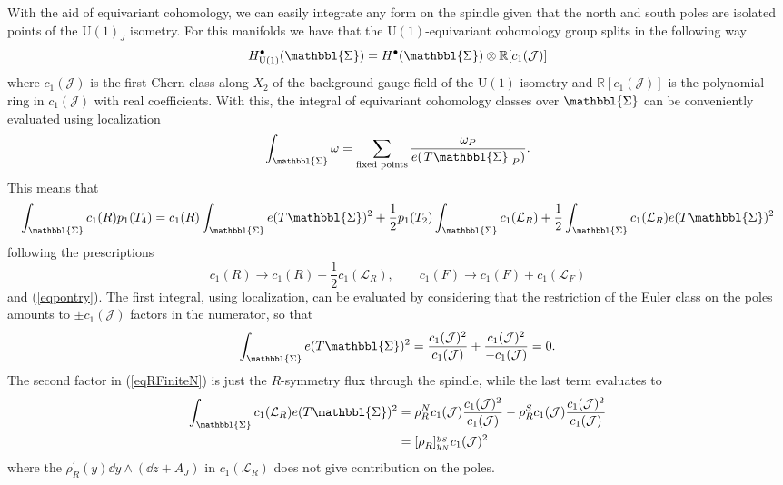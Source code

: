\documentclass[11pt]{article}
\theoremstyle{definition}
\numberwithin{equation}{section}
\newcommand{\flux}[2][]{[\rho_{#2}^{#1}]^{y_S}_{y_N}}
\newcommand{\Spindle}{\mathbbl{\Sigma}}
\newcommand*\U{\mathrm{U}}
\begin{document}
With the aid of equivariant cohomology, we can easily integrate any form on the spindle given that the north and south poles are isolated points of the $\U(1)_{J}$ isometry. For this manifolds we have that the $\U(1)$-equivariant cohomology group splits in the following way
\begin{equation}
	H^{\bullet}_{\U(1)}(\Spindle)=H^{\bullet}(\Spindle)\otimes \mathbb{R}[c_{1}(\mathcal{J})]
\end{equation}
where $c_{1}(\mathcal{J})$ is the first Chern class along $X_{2}$ of the background gauge field of the $\U(1)$ isometry and $\mathbb{R}[c_{1}(\mathcal{J})]$ is the polynomial ring in $c_{1}(\mathcal{J})$ with real coefficients. With this, the integral of equivariant cohomology classes over $\Spindle$ can be conveniently evaluated using localization
\begin{equation}
	\int_{\Spindle}\omega=\sum_{\text{fixed points}}\frac{\omega_{P}}{e(\left.T\Spindle\right|_{P})}.
\end{equation}
This means that
\begin{equation}
	\int_{\Spindle}c_{1}(R)p_{1}(T_{4})=c_{1}(R)\int_{\Spindle}e(T\Spindle)^{2}+\frac{1}{2}p_{1}(T_{2})\int_{\Spindle}c_{1}(\mathcal{L}_{R})+\frac{1}{2}\int_{\Spindle}c_{1}(\mathcal{L}_{R})e(T\Spindle)^{2}
	\label{eqRFiniteN}
\end{equation}
following the prescriptions
\begin{equation}
	c_{1}(R)\rightarrow c_{1}(R)+\frac{1}{2}c_{1}(\mathcal{L}_{R}),\qquad c_{1}(F)\rightarrow c_{1}(F)+c_{1}(\mathcal{L}_{F})
\end{equation}
and (\ref{eqpontry}). The first integral, using localization, can be evaluated by considering that the restriction of the Euler class on the poles amounts to $\pm c_{1}(\mathcal{J})$ factors in the numerator, so that
\begin{equation}
	\int_{\Spindle}e(T\Spindle)^{2}=\frac{c_{1}(\mathcal{J})^{2}}{c_{1}(\mathcal{J})}+\frac{c_{1}(\mathcal{J})^{2}}{-c_{1}(\mathcal{J})}=0.
\end{equation}
The second factor in (\ref{eqRFiniteN}) is just the $R$-symmetry flux through the spindle, while the last term evaluates to
\begin{equation}
\begin{split}
	\int_{\Spindle}c_{1}(\mathcal{L}_{R})e(T\Spindle)^{2}&=\rho_{R}^{N}c_{1}(\mathcal{J})\frac{c_{1}(\mathcal{J})^{2}}{c_{1}(\mathcal{J})}-\rho_{R}^{S}c_{1}(\mathcal{J})\frac{c_{1}(\mathcal{J})^{2}}{c_{1}(\mathcal{J})}\\
	&=\flux{R}c_{1}(\mathcal{J})^{2}
\end{split}
\end{equation}
where the $\rho^{\prime}_{R}(y)\dd{y}\wedge(\dd{z}+A_{J})$ in $c_{1}(\mathcal{L}_{R})$ does not give contribution on the poles.
\end{document}
